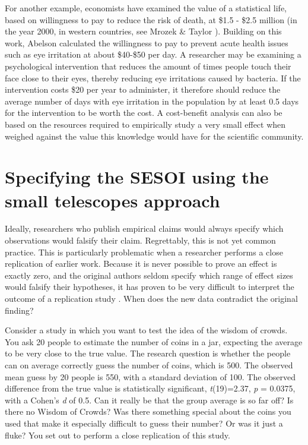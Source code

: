 \documentclass[
  oneside]{book}
\begin{document}
For another example, economists have examined the value of a statistical life, based on willingness to pay to reduce the risk of death, at \$1.5 - \$2.5 million (in the year 2000, in western countries, see Mrozek \& Taylor \citeyearpar{mrozek_what_2002}). Building on this work, Abelson \citeyearpar{abelson_value_2003} calculated the willingness to pay to prevent acute health issues such as eye irritation at about \$40-\$50 per day. A researcher may be examining a psychological intervention that reduces the amount of times people touch their face close to their eyes, thereby reducing eye irritations caused by bacteria. If the intervention costs \$20 per year to administer, it therefore should reduce the average number of days with eye irritation in the population by at least 0.5 days for the intervention to be worth the cost. A cost-benefit analysis can also be based on the resources required to empirically study a very small effect when weighed against the value this knowledge would have for the scientific community.

\hypertarget{specifying-the-sesoi-using-the-small-telescopes-approach}{%
\section{Specifying the SESOI using the small telescopes approach}\label{specifying-the-sesoi-using-the-small-telescopes-approach}}

Ideally, researchers who publish empirical claims would always specify which observations would falsify their claim. Regrettably, this is not yet common practice. This is particularly problematic when a researcher performs a close replication of earlier work. Because it is never possible to prove an effect is exactly zero, and the original authors seldom specify which range of effect sizes would falsify their hypotheses, it has proven to be very difficult to interpret the outcome of a replication study \citep{anderson_theres_2016}. When does the new data contradict the original finding?

Consider a study in which you want to test the idea of the wisdom of crowds. You ask 20 people to estimate the number of coins in a jar, expecting the average to be very close to the true value. The research question is whether the people can on average correctly guess the number of coins, which is 500. The observed mean guess by 20 people is 550, with a standard deviation of 100. The observed difference from the true value is statistically significant, \emph{t}(19)=2.37, \emph{p} = 0.0375, with a Cohen's \emph{d} of 0.5. Can it really be that the group average is so far off? Is there no Wisdom of Crowds? Was there something special about the coins you used that make it especially difficult to guess their number? Or was it just a fluke? You set out to perform a close replication of this study.
\end{document}
